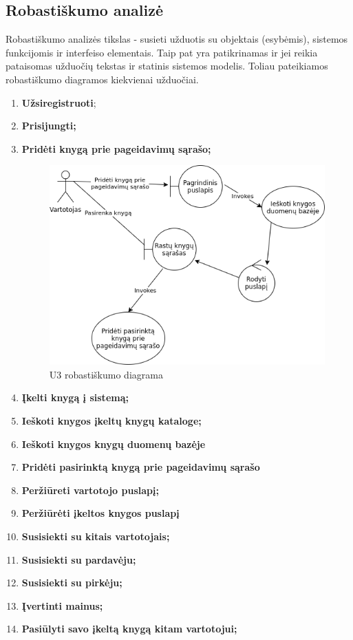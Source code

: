 \documentclass{VUMIFPSkursinis}
\begin{document}
	\subsection{Robastiškumo analizė}
		Robastiškumo analizės tikslas - susieti užduotis su objektais (esybėmis), sistemos funkcijomis ir 
		interfeiso elementais. Taip pat yra patikrinamas ir jei reikia pataisomas užduočių tekstas ir statinis sistemos modelis.
		Toliau pateikiamos robastiškumo diagramos kiekvienai užduočiai.
		\begin{enumerate}[label=\textbf{U\arabic*.}]
			\item \textbf{Užsiregistruoti};		
			\item \textbf{Prisijungti;}
			\item \textbf{Pridėti knygą prie pageidavimų sąrašo;}
				\begin{figure}[H]
					\centering
					\includegraphics[scale=0.9]{img/U3.png}
					\caption{U3 robastiškumo diagrama}
					\label{img:psi2-u3-robustness}
				\end{figure}
			\item \textbf{Įkelti knygą į sistemą;}
			\item \textbf{Ieškoti knygos įkeltų knygų kataloge;}
			\item \textbf{Ieškoti knygos knygų duomenų bazėje}
			\item \textbf{Pridėti pasirinktą knygą prie pageidavimų sąrašo}
			\item \textbf{Peržiūreti vartotojo puslapį;}
			\item \textbf{Peržiūrėti įkeltos knygos puslapį}
			\item \textbf{Susisiekti su kitais vartotojais;}
			\item \textbf{Susisiekti su pardavėju;}
			\item \textbf{Susisiekti su pirkėju;}
			\item \textbf{Įvertinti mainus;}
			\item \textbf{Pasiūlyti savo įkeltą knygą kitam vartotojui;}
		\end{enumerate}
\end{document}
